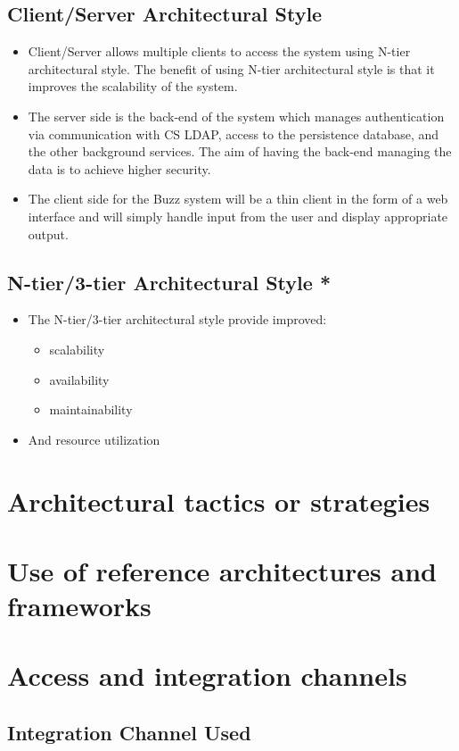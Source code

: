 \documentclass[12pt, oneside]{article}
\begin{document}
	\subsection{Client/Server Architectural Style}
	\begin{itemize}
		\item Client/Server allows multiple clients to access the system using N-tier architectural style. The benefit of using N-tier architectural style is that it improves the scalability of the system.
		\item The server side is the back-end of the system which manages authentication via communication with CS LDAP, access to the persistence database, and the other background services. The aim of having the back-end managing the data is to achieve higher security.
		\item The client side for the Buzz system will be a thin client in the form of a web interface and will simply handle input from the user and display appropriate output.
	\end{itemize}
	\subsection{N-tier/3-tier Architectural Style *}
	\begin{itemize}
		\item The N-tier/3-tier architectural style provide improved:
		\begin{itemize}
			\item scalability
			\item availability
			\item maintainability
		\end{itemize}
		\item And resource utilization
	\end{itemize}
\section{Architectural tactics or strategies}
\section{Use of reference architectures and frameworks}
\newpage
\section{Access and integration channels}
	\subsection{Integration Channel Used}
\end{document}

